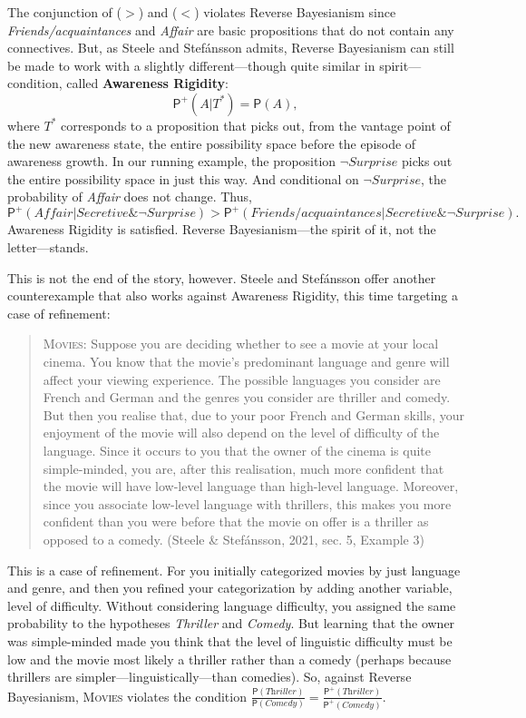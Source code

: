 \documentclass[
  11pt,
  dvipsnames,enabledeprecatedfontcommands]{scrartcl}
\newcommand{\pr}[1]{\ensuremath{\mathsf{P}(#1)}}
\newcommand{\ppr}[2]{\ensuremath{\mathsf{P}^{#1}(#2)}}
\begin{document}
The conjunction of (\(>\)) and (\(<\)) violates Reverse Bayesianism
since \textit{Friends/acquaintances} and \textit{Affair} are basic
propositions that do not contain any connectives. But, as Steele and
Stefánsson admits, Reverse Bayesianism can still be made to work with a
slightly different---though quite similar in spirit---condition, called
\textbf{Awareness Rigidity}: \[\ppr{+}{A \vert T^*}=\pr{A},\] where
\(T^*\) corresponds to a proposition that picks out, from the vantage
point of the new awareness state, the entire possibility space before
the episode of awareness growth. In our running example, the proposition
\(\neg\textit{Surprise}\) picks out the entire possibility space in just
this way. And conditional on \(\neg\textit{Surprise}\), the probability
of \textit{Affair} does not change. Thus,
\[\ppr{+}{\textit{Affair} \vert  \textit{Secretive} \& \neg\textit{Surprise} } > \ppr{+}{\textit{Friends/acquaintances} \vert \textit{Secretive} \& \neg\textit{Surprise}}. \]
Awareness Rigidity is satisfied. Reverse Bayesianism---the spirit of it,
not the letter---stands.

This is not the end of the story, however. Steele and Stefánsson offer
another counterexample that also works against Awareness Rigidity, this
time targeting a case of refinement:

\begin{quote}
\textsc{Movies}: Suppose you are deciding whether to see a movie at your
local cinema. You know that the movie's predominant language and genre
will affect your viewing experience. The possible languages you consider
are French and German and the genres you consider are thriller and
comedy. But then you realise that, due to your poor French and German
skills, your enjoyment of the movie will also depend on the level of
difficulty of the language. Since it occurs to you that the owner of the
cinema is quite simple-minded, you are, after this realisation, much
more confident that the movie will have low-level language than
high-level language. Moreover, since you associate low-level language
with thrillers, this makes you more confident than you were before that
the movie on offer is a thriller as opposed to a comedy. (Steele \&
Stefánsson, 2021, sec. 5, Example 3)
\end{quote}

\doublespace

\noindent This is a case of refinement. For you initially categorized
movies by just language and genre, and then you refined your
categorization by adding another variable, level of difficulty. Without
considering language difficulty, you assigned the same probability to
the hypotheses \textit{Thriller} and \textit{Comedy}. But learning that
the owner was simple-minded made you think that the level of linguistic
difficulty must be low and the movie most likely a thriller rather than
a comedy (perhaps because thrillers are simpler---linguistically---than
comedies). So, against Reverse Bayesianism, \textsc{Movies} violates the
condition
\(\frac{\pr{\textit{Thriller}}}{\pr{\textit{Comedy}}}=\frac{\ppr{+}{\textit{Thriller}}}{\ppr{+}{\textit{Comedy}}}\).
\end{document}
